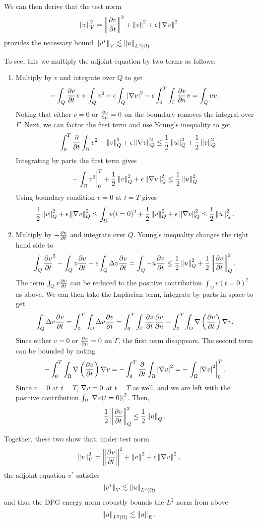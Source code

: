 \documentclass{article}
\begin{document}
We can then derive that the test norm
\[
\left\| v \right\|_V^2 = \left\| \frac{\partial v}{\partial t} \right\|^2 + \left\| v \right\|^2 + \epsilon\left\| \nabla v \right\|^2 
\]
provides the necessary bound $\left\| v^* \right\|_V \lesssim \left\| u \right\|_{L^2\left( \Omega \right)}$.

To see, this we multiply the adjoint equation by two terms as follows:
\begin{enumerate}
\item Multiply by $v$ and integrate over $Q$ to get
\[
-\int_Q \frac{\partial v}{\partial t}v + \int_Q v^2 + \epsilon \int_Q \left| \nabla v \right|^2 - \epsilon \int_0^T\int_{\Gamma} \frac{\partial v}{\partial n}v = \int_Q uv.
\]
Noting that either $v = 0$ or $\frac{\partial v}{\partial n} = 0$ on the boundary removes the integral over $\Gamma$.  Next, we can factor the first term and use Young's inequality to get
\[
-\int_0^T  \frac{\partial}{\partial t}\int_{\Omega} v^2 + \left\| v \right\|^2_Q + \epsilon \left\| \nabla v \right\|^2_Q \leq \frac{1}{2}\left\| u \right\|^2_Q + \frac{1}{2}\left\| v \right\|^2_Q
\]
Integrating by parts the first term gives
\[
-\left.\int_{\Omega} v^2\right|_0^T + \frac{1}{2}\left\| v \right\|^2_Q + \epsilon \left\| \nabla v \right\|^2_Q \leq \frac{1}{2}\left\| u \right\|^2_Q
\]
Using boundary condition $v=0$ at $t= T$ gives
\[
\frac{1}{2}\left\| v \right\|^2_Q + \epsilon \left\| \nabla v \right\|^2_Q \leq \int_{\Omega} v(t=0)^2 + \frac{1}{2}\left\| v \right\|^2_Q + \epsilon \left\| \nabla v \right\|^2_Q \leq \frac{1}{2}\left\| u \right\|^2_Q.
\]

\item Multiply by $-\frac{\partial v}{\partial t}$ and integrate over $Q$.  Young's inequality changes the right hand side to 
\[
\int_Q\frac{\partial v}{\partial t}^2 - \int_Q v\frac{\partial v}{\partial t} + \epsilon\int_Q \Delta v \frac{\partial v}{\partial t} = \int_Q -u \frac{\partial v}{\partial t} \leq \frac{1}{2}\left\| u \right\|_Q^2 + \frac{1}{2}\left\| \frac{\partial v}{\partial t} \right\|_Q^2 .
\]
The term $\int_Q v\frac{\partial v}{\partial t}$ can be reduced to the positive contribution $\int_{\Omega}{v(t=0)}^2  $ as above.  We can then take the Laplacian term, integrate by parts in space to get
\[
\int_Q \Delta v \frac{\partial v}{\partial t} = \int_0^T \int_{\Omega} \Delta v \frac{\partial v}{\partial t} =  \int_0^T \int_{\Gamma} \frac{\partial v}{\partial t}\frac{\partial v}{\partial n} - \int_0^T \int_{\Omega}\nabla\left( \frac{\partial v}{\partial t} \right)\nabla v.
\]
Since either $v = 0$ or $\frac{\partial v}{\partial n} = 0$ on $\Gamma$, the first term disappears.  The second term can be bounded by noting
\[
- \int_0^T \int_{\Omega}\nabla\left( \frac{\partial v}{\partial t} \right)\nabla v = - \int_0^T \frac{\partial}{\partial t}\int_{\Omega}\left| \nabla v \right| ^2 = - \left.\int_{\Omega}\left| \nabla v \right|^2 \right|_0^T.
\]
Since $v = 0$ at $t=T$, $\nabla v = 0$ at $t=T$ as well, and we are left with the positive contribution $\int_{\Omega}\left| \nabla v(t=0) \right|^2$.  Then,
\[
\frac{1}{2}\left\| \frac{\partial v}{\partial t} \right\|_Q^2 \leq \frac{1}{2}\left\| u \right\|_Q.
\]
\end{enumerate}
Together, these two show that, under test norm
\[
\left\| v \right\|_V^2 = \left\| \frac{\partial v}{\partial t} \right\|^2 + \left\| v \right\|^2 + \epsilon\left\| \nabla v \right\|^2,
\]
the adjoint equation $v^*$ satisfies
\[
\left\| v^* \right\|_V \lesssim \left\| u \right\|_{L^2\left( \Omega \right)}
\]
and thus the DPG energy norm robustly bounds the $L^2$ norm from above
\[
\left\| u \right\|_{L^2\left( \Omega \right)} \lesssim \left\| u \right\|_E.
\]
\end{document}
